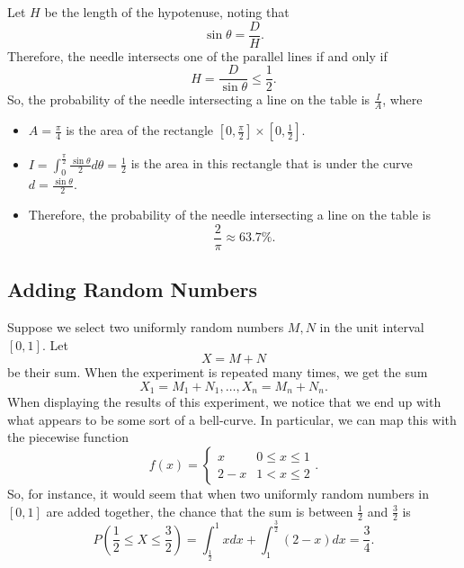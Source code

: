 \documentclass[letterpaper]{article}
\begin{document}
\bigskip 

Let $H$ be the length of the hypotenuse, noting that 
\[\sin \theta = \frac{D}{H}.\]
Therefore, the needle intersects one of the parallel lines if and only if 
\[H = \frac{D}{\sin \theta} \leq \frac{1}{2}.\]
So, the probability of the needle intersecting a line on the table is $\frac{I}{A}$, where 
\begin{itemize}
    \item $A = \frac{\pi}{4}$ is the area of the rectangle $\left[0, \frac{\pi}{2}\right] \times \left[0, \frac{1}{2}\right]$. 
    \item $I = \int_0^{\frac{\pi}{2}} \frac{\sin\theta}{2} d\theta = \frac{1}{2}$ is the area in this rectangle that is under the curve $d = \frac{\sin \theta}{2}$. 
    \item Therefore, the probability of the needle intersecting a line on the table is 
    \[\frac{2}{\pi} \approx 63.7\%.\]
\end{itemize}

\subsection{Adding Random Numbers}
Suppose we select two uniformly random numbers $M, N$ in the unit interval $[0, 1]$. Let 
\[X = M + N\]
be their sum. When the experiment is repeated many times, we get the sum 
\[X_1 = M_1 + N_1, \dots, X_n = M_n + N_n.\]
When displaying the results of this experiment, we notice that we end up with what appears to be some sort of a bell-curve. In particular, we can map this with the piecewise function 
\[f(x) = \begin{cases}
    x & 0 \leq x \leq 1 \\ 
    2 - x & 1 < x \leq 2
\end{cases}.\]
So, for instance, it would seem that when two uniformly random numbers in $[0, 1]$ are added together, the chance that the sum is between $\frac{1}{2}$ and $\frac{3}{2}$ is 
\[P\left(\frac{1}{2} \leq X \leq \frac{3}{2}\right) = \int_{\frac{1}{2}}^1 xdx + \int_1^{\frac{3}{2}} (2 - x)dx = \frac{3}{4}.\]
\end{document}

